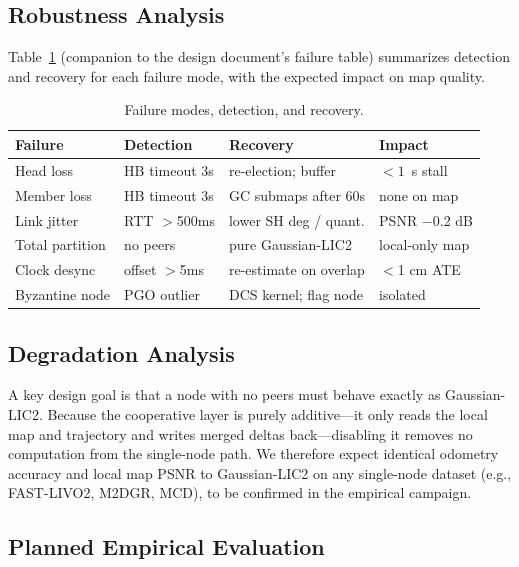\subsection{Robustness Analysis}

Table~\ref{tab:failure} (companion to the design document's failure table)
summarizes detection and recovery for each failure mode, with the expected
impact on map quality.

\begin{table}[t]
  \centering
  \caption{Failure modes, detection, and recovery.}
  \label{tab:failure}
  \small
  \begin{tabular}{llll}
    \toprule
    Failure & Detection & Recovery & Impact \\
    \midrule
    Head loss        & HB timeout 3s & re-election; buffer    & $<1$~s stall \\
    Member loss      & HB timeout 3s & GC submaps after 60s   & none on map  \\
    Link jitter      & RTT $>$500ms  & lower SH deg / quant.  & PSNR $-$0.2 dB \\
    Total partition  & no peers      & pure Gaussian-LIC2     & local-only map \\
    Clock desync     & offset $>$5ms & re-estimate on overlap & $<$1 cm ATE \\
    Byzantine node   & PGO outlier   & DCS kernel; flag node  & isolated     \\
    \bottomrule
  \end{tabular}
\end{table}

\subsection{Degradation Analysis}

A key design goal is that a node with no peers must behave exactly as
Gaussian-LIC2. Because the cooperative layer is purely additive---it only
reads the local map and trajectory and writes merged deltas back---disabling
it removes no computation from the single-node path. We therefore expect
identical odometry accuracy and local map PSNR to Gaussian-LIC2 on any
single-node dataset (e.g., FAST-LIVO2, M2DGR, MCD), to be confirmed in the
empirical campaign.

\subsection{Planned Empirical Evaluation}

